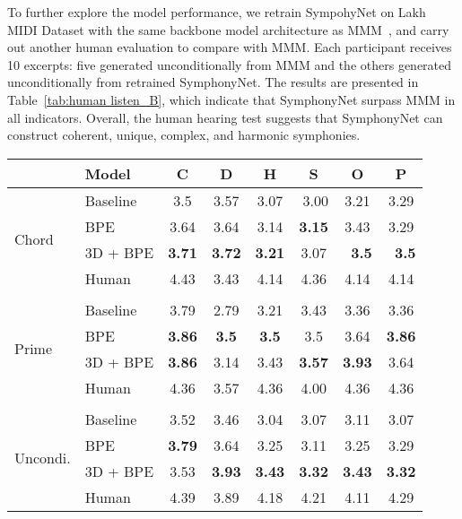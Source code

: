 \documentclass{article}
\begin{document}
To further explore the model performance, we retrain SympohyNet on Lakh MIDI Dataset \cite{lakh} with the same backbone model architecture as MMM~\cite{mmm}, and carry out another human evaluation to compare with MMM. Each participant receives 10 excerpts: five generated unconditionally from MMM and the others generated unconditionally from retrained SymphonyNet. The results are presented in Table~\ref{tab:human listen_B}, which indicate that SymphonyNet surpass MMM in all indicators.  Overall, the human hearing test suggests that SymphonyNet can construct coherent, unique, complex, and harmonic symphonies.
\begin{table}
\small
\begin{subtable}{\linewidth}

\setlength{\tabcolsep}{4.25 pt}
\renewcommand{\arraystretch}{1.15}
\begin{tabular}{llcccccc}
 \hline
 & \textbf{Model} & \textbf{C} & \textbf{D} & \textbf{H} & \textbf{S} & \textbf{O} & \textbf{P} \\ 
  \hline
\multirow{4}{*}{Chord} & Baseline & 3.5 & 3.57 & 3.07 & \multicolumn{1}{r}{3.00} & 3.21 & 3.29 \\
 & BPE & 3.64 & 3.64 & 3.14 & \textbf{3.15} & 3.43 & 3.29 \\
 & 3D + BPE & \multicolumn{1}{r}{\textbf{3.71}} & \multicolumn{1}{r}{\cellcolor[HTML]{FFFC9E}\textbf{3.72}} & \multicolumn{1}{r}{\textbf{3.21}} & 3.07 & \multicolumn{1}{r}{\textbf{3.5}} & \multicolumn{1}{r}{\textbf{3.5}} \\ \cline{2-8} 
 & Human & 4.43 & 3.43 & 4.14 & 4.36 & 4.14 & 4.14 \\ 
  \hline
 &  &  &  &  &  &  &  \\
  \hline
\multirow{4}{*}{Prime} & Baseline & 3.79 & 2.79 & 3.21 & 3.43 & 3.36 & 3.36 \\
 & BPE & \multicolumn{1}{r}{\textbf{3.86}} & \textbf{3.5} & \textbf{3.5} & 3.5 & 3.64 & \textbf{3.86} \\
 & 3D + BPE & \textbf{3.86} & 3.14 & 3.43 & \textbf{3.57} & \textbf{3.93} & 3.64 \\
 \cline{2-8} 
 & Human & 4.36 & 3.57 & 4.36 & 4.00 & 4.36 & 4.36 \\
  \hline
 &  &  &  &  &  &  &  \\
  \hline
\multirow{4}{*}{Uncondi.} & Baseline & 3.52 & 3.46 & 3.04 & 3.07 & 3.11 & 3.07 \\
 & BPE & \textbf{3.79} & 3.64 & 3.25 & 3.11 & 3.25 & 3.29 \\
 & 3D + BPE & 3.53 & \cellcolor[HTML]{FFFC9E}\textbf{3.93} & \textbf{3.43} & \textbf{3.32} & \textbf{3.43} & \textbf{3.32} \\
 \cline{2-8} 
 & Human & 4.39 & 3.89 & 4.18 & 4.21 & 4.11 & 4.29 \\
  \hline


\end{tabular}
\end{subtable}
\end{table}
\end{document}
